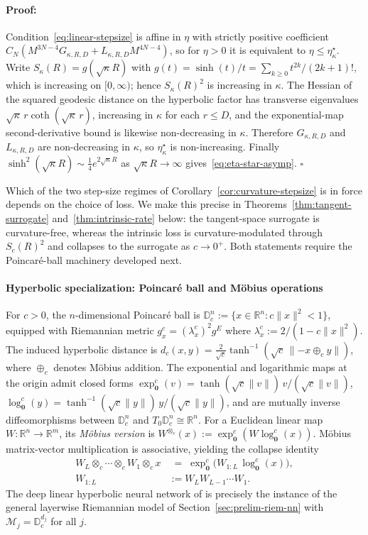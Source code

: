 \documentclass[letterpaper]{article}
\newenvironment{proof}[1][Proof]{\paragraph{#1:}}{\hfill$\square$}
\newcommand{\R}{\mathbb{R}}
\newcommand{\D}{\mathbb{D}}      %
\newcommand{\Mob}{\oplus_c}
\newcommand{\Mobm}{\otimes_c}
\newcommand{\exps}{\exp_{\mathbf{0}}^c}
\newcommand{\logs}{\log_{\mathbf{0}}^c}
\begin{document}
\begin{proof}
Condition~\eqref{eq:linear-stepsize} is affine in $\eta$ with strictly
positive coefficient $C_N(M^{3N-4}G_{\kappa,R,D}+L_{\kappa,R,D}M^{4N-4})$, so
for $\eta>0$ it is equivalent to $\eta\le\eta^\star_\kappa$. Write
$S_\kappa(R)=g(\sqrt{\kappa}R)$ with $g(t)=\sinh(t)/t=\sum_{k\ge0}t^{2k}/(2k+1)!$,
which is increasing on $[0,\infty)$; hence $S_\kappa(R)^2$ is increasing in
$\kappa$. The Hessian of the squared geodesic distance on the
hyperbolic factor has transverse eigenvalues $\sqrt{\kappa}\,r\coth(\sqrt{\kappa}\,r)$,
increasing in $\kappa$ for each $r\le D$, and the exponential-map
second-derivative bound is likewise non-decreasing in $\kappa$. Therefore
$G_{\kappa,R,D}$ and $L_{\kappa,R,D}$ are non-decreasing in $\kappa$, so
$\eta^\star_\kappa$ is non-increasing. Finally $\sinh^2(\sqrt{\kappa}R)\sim
\tfrac14 e^{2\sqrt{\kappa}R}$ as $\sqrt{\kappa}R\to\infty$
gives~\eqref{eq:eta-star-asymp}.
\end{proof}

Which of the two step-size regimes of Corollary~\ref{cor:curvature-stepsize}
is in force depends on the choice of loss. We make this precise in
Theorems~\ref{thm:tangent-surrogate} and~\ref{thm:intrinsic-rate} below: the
tangent-space surrogate is curvature-free, whereas the intrinsic loss is
curvature-modulated through $S_c(R)^2$ and collapses to the surrogate as
$c\to0^+$. Both statements require the Poincar\'e-ball machinery developed
next.


\paragraph{Hyperbolic specialization: Poincar\'e ball and M\"obius operations}
\label{sec:disc-hyperbolic}

For $c > 0$, the $n$-dimensional Poincar\'e ball is $\D_c^n := \{x \in
\R^n : c \|x\|^2 < 1\}$, equipped with Riemannian metric
$g_x^c = (\lambda_x^c)^2 g^E$ where $\lambda_x^c := 2/(1 - c\|x\|^2)$. The
induced hyperbolic distance is
$d_c(x, y) = \tfrac{2}{\sqrt c} \tanh^{-1}(\sqrt c\, \|{-x} \Mob y\|)$,
where $\Mob$ denotes M\"obius addition. The exponential and logarithmic
maps at the origin admit closed forms
$\exps(v) = \tanh(\sqrt c \|v\|)\, v/(\sqrt c \|v\|)$,
$\logs(y) = \tanh^{-1}(\sqrt c \|y\|)\, y/(\sqrt c \|y\|)$,
and are mutually inverse diffeomorphisms between $\D_c^n$ and $T_0\D_c^n
\cong \R^n$. For a Euclidean linear map $W : \R^n \to \R^m$, its
\emph{M\"obius version} is $W^{\Mobm}(x) := \exps(W \logs(x))$.
M\"obius matrix-vector multiplication is associative, yielding the
collapse identity
\begin{equation}
\label{eq:collapse}
\begin{aligned}
W_L \Mobm \cdots \Mobm W_1 \Mobm x &\;=\; \exps\!\big(W_{1:L}\, \logs(x)\big),\\
W_{1:L} &:= W_L W_{L-1} \cdots W_1.
\end{aligned}
\end{equation}
The deep linear hyperbolic neural network of
\cite{tifrea2018poincar} is precisely the instance of the general
layerwise Riemannian model of Section~\ref{sec:prelim-riem-nn} with
$\mathcal M_j = \D_c^{d_j}$ for all $j$.
\end{document}
